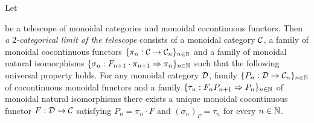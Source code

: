 \begin{definition}
Let 
\begin{center}   
\end{center}
be a telescope of monoidal categories and monoidal cocontinuous functors. Then \textit{a $2$-categorical limit of the telescope} consists of a monoidal category ${\mathcal C}$, a family of monoidal cocontinuous functors $\{\pi_n:{\mathcal C}\rightarrow {\mathcal C}_n\}_{n\in {\mathbb N}}$ and a family of monoidal natural isomorphisms $\{\sigma_n:F_{n+1} \cdot \pi_{n+1}\Rightarrow \pi_n\}_{n\in {\mathbb N}}$ such that the following universal property holds. For any monoidal category ${\mathcal D}$, family $\{P_n:{\mathcal D}\rightarrow {\mathcal C}_n\}_{n\in {\mathbb N}}$ of cocontinuous monoidal functors and a family $\{\tau_n:F_nP_{n+1}\Rightarrow P_{n}\}_{n\in {\mathbb N}}$ of monoidal natural isomorphisms there exists a unique monoidal cocontinuous functor $F:{\mathcal D}\rightarrow {\mathcal C}$ satisfying $P_n = \pi_n \cdot F$ and $\left(\sigma_n\right)_F = \tau_n$ for every $n\in {\mathbb N}$.
\end{definition}

